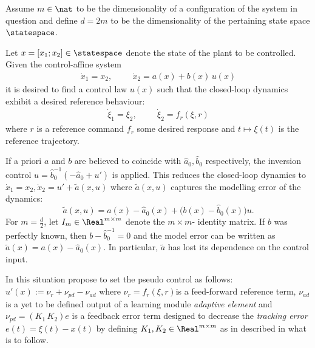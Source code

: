 Assume $m \in \nat$ to be the dimensionality of a configuration of the system in question and define $d = 2m$ to be the dimensionality of the pertaining state space $\statespace$.

Let $x = [x_1;x_2] \in \statespace$ denote the state of the plant to be controlled.
Given the control-affine system 
\begin{align}
\dot x_1 = x_2, \hspace{1cm}  \dot x_2 = a(x) + b(x) \, u(x) \label{eq:secorddynctrlaff}
\end{align}
%
it is desired to find a control law $u(x)$ such that the closed-loop dynamics exhibit a desired reference behaviour:
%
\begin{align}
\dot \xi_1 = \xi_2, \hspace{1cm}   \dot \xi_2 = f_{r}(\xi,r)
\end{align}
where $r$ is a reference command $f_r$ some desired response and $t \mapsto \xi (t)$ is the reference trajectory.

If a priori $a$ and $b$ are believed to coincide with $\hat a_0, \hat b_0$ respectively, the inversion control 
$u = \hat b_0^{-1} (- \hat a_0 +u')$ is applied. This reduces the closed-loop dynamics to 
$\dot x_1 = x_2, \dot x_2 = u' + \tilde a(x,u) $
where $\tilde a(x,u)$ captures the modelling error of the dynamics: 
\begin{equation}
	\tilde a (x,u ) = a(x) - \hat a_0(x) + \bigl(b(x) - \hat b_0(x)\bigr) u.
\end{equation}
 For $m = \frac d 2$, let $I_m \in \Real^{m \times m}$ denote the $m \times m$- identity matrix.  If $b$ was perfectly known, then $b - \hat b_0^{-1} = 0$ and the model error can be written as $\tilde a (x)= a(x) - \hat a_0(x)$. In particular, $\tilde a$ has lost its dependence on the control input. 



In this situation \cite{Chowdhary2013,ChowdharyCDC2013} propose to set 
the pseudo control as follows: $u'(x) :=  \nu_{r} + \nu_{pd} - \nu_{ad}$ where $\nu_{r} = f_{r}(\xi,r)$is a feed-forward reference term,  $\nu_{ad}$ is a yet to be defined output of a learning module \emph{adaptive element} and $\nu_{pd} = (K_1 \, K_2) e$ is a feedback error term designed to decrease the \textit{tracking error} $e(t) = \xi(t) - x(t)$ by defining $K_1,K_2 \in \Real^{m \times m}$ as in described in what is to follow.

